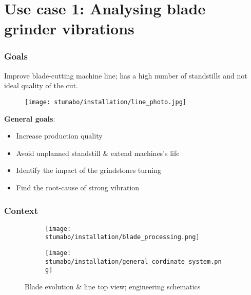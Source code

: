\section{Use case 1: Analysing blade grinder vibrations}
\SectionPage

\begin{frame}
    \frametitle{Goals}
    \vspace*{\fill}
    Improve blade-cutting machine line; has a high number of standstills and not ideal quality of the cut.
    \begin{figure}[ht]
        \texttt{[image: stumabo/installation/line\_photo.jpg]}
    \end{figure}
    \textbf{General goals}:
    \begin{itemize}
        \item Increase production quality
        \item Avoid unplanned standstill \& extend machines's life
        \item Identify the impact of the grindstones turning
        \item Find the root-cause of strong vibration
    \end{itemize}

    \vspace*{\fill}
\end{frame}

\begin{frame}
    \frametitle{Context}
    \begin{figure}[ht]
        \begin{subfigure}{\textwidth}
            \centering
            \texttt{[image: stumabo/installation/blade\_processing.png]}
        \end{subfigure}
        \begin{subfigure}{\textwidth}
            \centering
            \texttt{[image: stumabo/installation/general\_cordinate\_system.png]}
        \end{subfigure}
        \caption{Blade evolution \& line top view; engineering schematics}
    \end{figure}
\end{frame}

